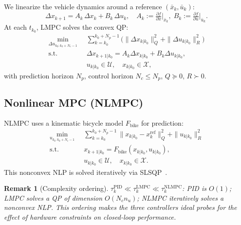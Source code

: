 \documentclass[conference]{IEEEtran}
\newcommand{\calX}{\mathcal{X}}
\newcommand{\calU}{\mathcal{U}}
\newtheorem{remark}{Remark}
\begin{document}
We linearize the vehicle dynamics around a reference
$(\bar{x}_k, \bar{u}_k)$:
\begin{equation}\label{eq:lin}
  \Delta x_{k+1} = A_k\,\Delta x_k + B_k\,\Delta u_k, \quad
  A_k := \tfrac{\partial f}{\partial x}\Big|_{\bar{x}_k},\;
  B_k := \tfrac{\partial f}{\partial u}\Big|_{\bar{u}_k}.
\end{equation}
At each $t_{k_0}$, LMPC solves the convex QP:
\begin{subequations}\label{eq:lmpc}
\begin{align}
  \min_{\Delta u_{k_0:k_0+N_c-1}} \;\;&
    \sum_{k=k_0}^{k_0+N_p-1}\bigl(
    \|\Delta x_{k|k_0}\|_Q^2 + \|\Delta u_{k|k_0}\|_R^2\bigr)\\
  \text{s.t.}\;\; & \Delta x_{k+1|k_0} = A_k\Delta x_{k|k_0}
    + B_k\Delta u_{k|k_0}, \\
  & u_{k|k_0} \in \calU,\quad x_{k|k_0} \in \calX,
\end{align}
\end{subequations}
with prediction horizon $N_p$, control horizon $N_c \leq N_p$,
$Q \succeq 0$, $R \succ 0$.

\subsection{Nonlinear MPC (NLMPC)}\label{sec:nlmpc}

NLMPC uses a kinematic bicycle model $F_\text{bike}$ for prediction:
\begin{subequations}\label{eq:nlmpc}
\begin{align}
  \min_{u_{k_0:k_0+N_c-1}} \;\;&
    \sum_{k=k_0}^{k_0+N_p-1}
    \|x_{k|k_0} - x_k^\text{ref}\|_Q^2 + \|u_{k|k_0}\|_R^2\\
  \text{s.t.}\;\;& x_{k+1|k_0} = F_\text{bike}(x_{k|k_0},
    u_{k|k_0}), \\
  & u_{k|k_0} \in \calU,\quad x_{k|k_0} \in \calX.
\end{align}
\end{subequations}
This nonconvex NLP is solved iteratively via
SLSQP~\cite{kraft1988slsqp}.

\begin{remark}[Complexity ordering]\label{rem:complexity}
  $\tau_k^{\mathrm{PID}} \ll \tau_k^{\mathrm{LMPC}} \ll
  \tau_k^{\mathrm{NLMPC}}$:
  PID is $O(1)$; LMPC solves a QP of dimension
  $O(N_c n_u)$; NLMPC iteratively solves a nonconvex NLP.
  This ordering makes the three controllers ideal probes for the
  effect of hardware constraints on closed-loop performance.
\end{remark}
\end{document}
